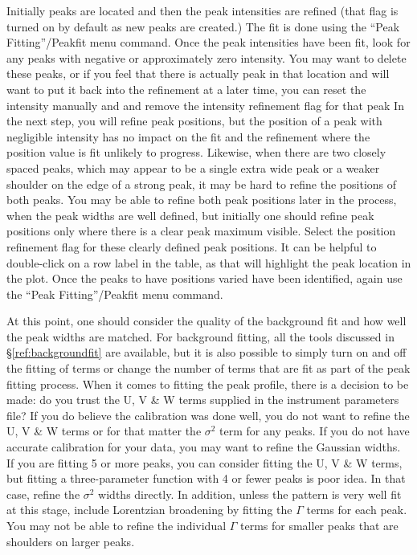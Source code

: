 Initially peaks are located and then the peak intensities are refined (that flag is turned on by default as new peaks are created.) The fit is done using the ``Peak Fitting''/Peakfit menu command. Once the peak intensities have been fit, look for any peaks with negative or approximately zero intensity. You may want to delete these peaks, or if you feel that there is actually peak in that location and will want to put it back into the refinement at a later time, you can reset the intensity manually and and remove the intensity refinement flag for that peak In the next step, you will refine peak positions, but the position of a peak with negligible intensity has no impact on the fit and the refinement where the position value is fit unlikely to progress. Likewise, when there are two closely spaced peaks, which may appear to be a single extra wide peak or a weaker shoulder on the edge of a strong peak, it may be hard to refine the positions of both peaks. You may be able to refine both peak positions later in the process, when the peak widths are well defined, but initially one should refine peak positions only where there is a clear peak maximum visible. Select the position refinement flag for these clearly defined peak positions. It can be helpful to double-click on a row label in the table, as that will highlight the peak location in the plot. Once the peaks to have positions varied have been identified, again use the ``Peak Fitting''/Peakfit menu command. 

At this point, one should consider the quality of the background fit and how well the peak widths are matched. For background fitting, all the tools discussed in \S\ref{ref:backgroundfit} are available, but it is also possible to simply turn on and off the fitting of terms or change the number of terms that are fit as part of the peak fitting process. When it comes to fitting the peak profile, there is a decision to be made: do you trust the U, V \& W terms supplied in the instrument parameters file? If you do believe the calibration was done well, you do not want to refine the U, V \& W terms or for that matter the $\sigma^2$ term for any peaks. If you do not have accurate calibration for your data, you may want to refine the Gaussian widths. If you are fitting 5 or more peaks, you can consider fitting the  U, V \& W terms, but fitting a three-parameter function with 4 or fewer peaks is poor idea. In that case, refine the $\sigma^2$ widths directly. In addition, unless the pattern is very well fit at this stage, include Lorentzian broadening by fitting the $\Gamma$ terms for each peak. You may not be able to refine the individual $\Gamma$ terms for smaller peaks that are shoulders on larger peaks. 

